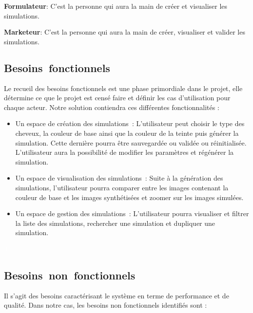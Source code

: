 \textbf{Formulateur}: C’est la personne qui aura la main de créer et visualiser les simulations.

\newline \textbf{Marketeur}: C’est la personne qui aura la main de créer, visualiser et valider les simulations.


\subsection{Besoins\textcolor{white}{J}fonctionnels}
Le recueil des besoins fonctionnels est une phase primordiale dans le projet, elle détermine ce que le projet est censé faire et définir les cas d’utilisation pour chaque acteur. Notre solution contiendra ces différentes fonctionnalités :
\begin{itemize}
\begin{itemize}[label=--]
\item Un espace de création des simulations : L’utilisateur peut choisir le type des cheveux, la couleur de base ainsi que la couleur de la teinte puis générer la simulation. Cette dernière pourra être sauvegardée ou validée ou réinitialisée. L’utilisateur aura la possibilité de modifier les paramètres et régénérer la simulation.
\item Un espace de visualisation des simulations : Suite à la génération des simulations, l’utilisateur pourra comparer entre les images contenant la couleur de base et les images synthétisées et zoomer sur les images simulées.
\item Un espace de gestion des simulations : L’utilisateur pourra visualiser et filtrer la liste des simulations, rechercher une simulation et dupliquer une simulation.
\end{itemize}

\end{itemize}

\textcolor{white}{J} 
\subsection{Besoins\textcolor{white}{J}non\textcolor{white}{J}fonctionnels}
Il s’agit des besoins caractérisant le système en terme de performance et de qualité. Dans notre cas, les besoins non fonctionnels identifiés sont :

